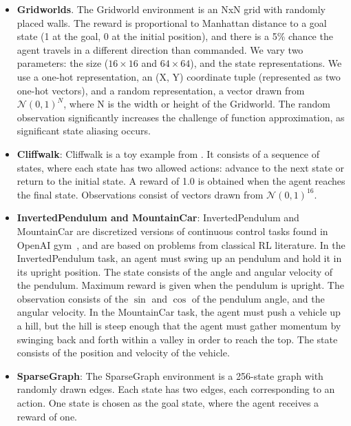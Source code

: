 \begin{itemize}

\item \textbf{Gridworlds}. The Gridworld environment is an NxN grid with randomly placed walls. The reward is proportional to Manhattan distance to a goal state (1 at the goal, 0 at the initial position), and there is a 5\% chance the agent travels in a different direction than commanded. We vary two parameters: the size ($16 \times 16$ and $64 \times 64$), and the state representations. We use a one-hot representation, an (X, Y) coordinate tuple (represented as two one-hot vectors), and a random representation, a vector drawn from $\mathcal{N}(0, 1)^N$, where N is the width or height of the Gridworld. The random observation significantly increases the challenge of function approximation, as significant state aliasing occurs.

\item \textbf{Cliffwalk}: Cliffwalk is a toy example from \citet{Schaul2015}. It consists of a sequence of states, where each state has two allowed actions: advance to the next state or return to the initial state. A reward of 1.0 is obtained when the agent reaches the final state. Observations consist of vectors drawn from $\mathcal{N}(0, 1)^{16}$.

\item \textbf{InvertedPendulum and MountainCar}: InvertedPendulum and MountainCar are discretized versions of continuous control tasks found in OpenAI gym~\citep{gym}, and are based on problems from classical RL literature. In the InvertedPendulum task, an agent must swing up an pendulum and hold it in its upright position. The state consists of the angle and angular velocity of the pendulum. Maximum reward is given when the pendulum is upright. The observation consists of the $\sin$ and $\cos$ of the pendulum angle, and the angular velocity. In the MountainCar task, the agent must push a vehicle up a hill, but the hill is steep enough that the agent must gather momentum by swinging back and forth within a valley in order to reach the top. The state consists of the position and velocity of the vehicle.

\item \textbf{SparseGraph}: The SparseGraph environment is a 256-state graph with randomly drawn edges. Each state has two edges, each corresponding to an action. One state is chosen as the goal state, where the agent receives a reward of one.

\end{itemize}


